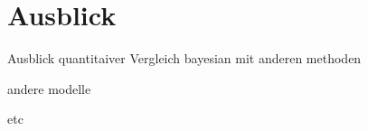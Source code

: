\section{Ausblick}

\begin{frame}{Ausblick}
    quantitaiver Vergleich bayesian mit anderen methoden

    andere modelle

    etc
    
\end{frame}
